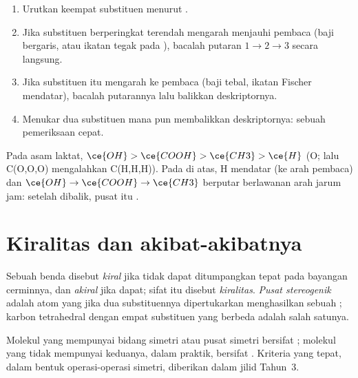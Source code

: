 \begin{method}\label{met:b1:stereochemistry-in-depth:cip}
\begin{enumerate}
  \item Urutkan keempat substituen menurut .
  \item Jika substituen berperingkat terendah mengarah menjauhi pembaca
        (baji bergaris, atau ikatan tegak pada ), bacalah
        putaran $1 \to 2 \to 3$ secara langsung.
  \item Jika substituen itu mengarah ke pembaca (baji tebal, ikatan
        Fischer mendatar), bacalah putarannya lalu balikkan deskriptornya.
  \item Menukar dua substituen mana pun membalikkan deskriptornya: sebuah
        pemeriksaan cepat.
\end{enumerate}
Pada asam laktat, $\ce{OH} > \ce{COOH} > \ce{CH3} > \ce{H}$ (O; lalu
C(O,O,O) mengalahkan C(H,H,H)). Pada  di atas, H mendatar
(ke arah pembaca) dan $\ce{OH} \to \ce{COOH} \to \ce{CH3}$ berputar
berlawanan arah jarum jam: setelah dibalik, pusat itu .
\end{method}

\section{Kiralitas dan akibat-akibatnya}

\begin{definition}\label{def:b1:stereochemistry-in-depth:stereocentre}
Sebuah benda disebut \emph{kiral} jika tidak dapat
ditumpangkan tepat pada bayangan cerminnya, dan \emph{akiral}
jika dapat; sifat itu disebut \emph{kiralitas}.
\emph{Pusat stereogenik} adalah atom yang jika
dua substituennya dipertukarkan menghasilkan sebuah ; karbon
tetrahedral dengan empat substituen yang berbeda adalah salah satunya.
\end{definition}

Molekul yang mempunyai bidang simetri atau pusat simetri bersifat ;
molekul yang tidak mempunyai keduanya, dalam praktik, bersifat .
Kriteria yang tepat, dalam bentuk operasi-operasi simetri, diberikan
dalam jilid Tahun~3.

